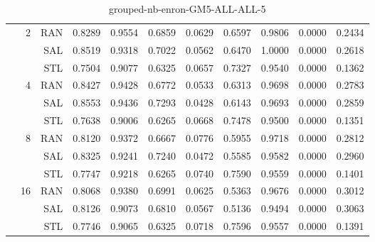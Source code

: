 \begin{center}
\begin{table}[htbp]
\begin{center}
\begin{tabular}{ | r | r | r | r | r | r | r | r | r | r | r |}
 & \multirow{3}{*}{2} & RAN & 0.8289 & 0.9554 & 0.6859 & 0.0629 & 0.6597 & 0.9806 & 0.0000 & 0.2434\\ \cline{3-11}
 &   & SAL & 0.8519 & 0.9318 & 0.7022 & 0.0562 & 0.6470 & 1.0000 & 0.0000 & 0.2618\\ \cline{3-11}
 &   & STL & 0.7504 & 0.9077 & 0.6325 & 0.0657 & 0.7327 & 0.9540 & 0.0000 & 0.1362\\ \cline{2-11}
 & \multirow{3}{*}{4} & RAN & 0.8427 & 0.9428 & 0.6772 & 0.0533 & 0.6313 & 0.9698 & 0.0000 & 0.2783\\ \cline{3-11}
 &   & SAL & 0.8553 & 0.9436 & 0.7293 & 0.0428 & 0.6143 & 0.9693 & 0.0000 & 0.2859\\ \cline{3-11}
 &   & STL & 0.7638 & 0.9006 & 0.6265 & 0.0668 & 0.7478 & 0.9500 & 0.0000 & 0.1351\\ \cline{2-11}
 & \multirow{3}{*}{8} & RAN & 0.8120 & 0.9372 & 0.6667 & 0.0776 & 0.5955 & 0.9718 & 0.0000 & 0.2812\\ \cline{3-11}
 &   & SAL & 0.8325 & 0.9241 & 0.7240 & 0.0472 & 0.5585 & 0.9582 & 0.0000 & 0.2960\\ \cline{3-11}
 &   & STL & 0.7747 & 0.9218 & 0.6265 & 0.0740 & 0.7590 & 0.9559 & 0.0000 & 0.1401\\ \cline{2-11}
 & \multirow{3}{*}{16} & RAN & 0.8068 & 0.9380 & 0.6991 & 0.0625 & 0.5363 & 0.9676 & 0.0000 & 0.3012\\ \cline{3-11}
 &   & SAL & 0.8126 & 0.9073 & 0.6810 & 0.0567 & 0.5136 & 0.9494 & 0.0000 & 0.3063\\ \cline{3-11}
 &   & STL & 0.7746 & 0.9065 & 0.6325 & 0.0718 & 0.7596 & 0.9557 & 0.0000 & 0.1391\\ \cline{2-11}
\hline
\end{tabular}
\caption{grouped-nb-enron-GM5-ALL-ALL-5}
\end{center}
 \end{table}
\end{center}

